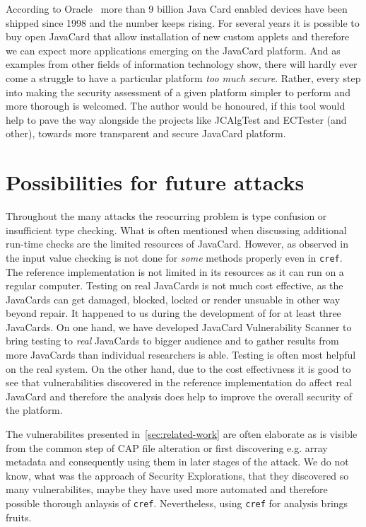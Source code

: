         According to Oracle~\cite{oraclehome} more than 9 billion Java Card enabled devices have been shipped since 1998 and the number keeps rising. For several years it is possible to buy open JavaCard that allow installation of new custom applets and therefore we can expect more applications emerging on the JavaCard platform.
        And as examples from other fields of information technology show, there will hardly ever come a struggle to have a particular platform \textit{too much secure}. Rather, every step into making the security assessment of a given platform simpler to perform and more thorough is welcomed. The author would be honoured, if this tool would help to pave the way alongside the projects like JCAlgTest and ECTester (and other), towards more transparent and secure JavaCard platform.

        \section{Possibilities for future attacks}

        Throughout the many attacks the reocurring problem is type confusion or insufficient type checking. What is often mentioned when discussing additional run-time checks are the limited resources of JavaCard. However, as observed in~\cite{se:oracle:part1, se:oracle:part2, se:oracle:part3} the input value checking is not done for \textit{some} methods properly even in \texttt{cref}. The reference implementation is not limited in its resources as it can run on a regular computer. Testing on real JavaCards is not much cost effective, as the JavaCards can get damaged, blocked, locked or render unsuable in other way beyond repair. It happened to us during the development of \javus for at least three JavaCards. On one hand, we have developed JavaCard Vulnerability Scanner to bring testing to \textit{real} JavaCards to bigger audience and to gather results from more JavaCards than individual researchers is able. Testing is often most helpful on the real system. On the other hand, due to the cost effectivness it is good to see that vulnerabilities discovered in the reference implementation do affect real JavaCard and therefore the analysis does help to improve the overall security of the platform.


        The vulnerabilites presented in~\ref{sec:related-work} are often elaborate as is visible from the common step of CAP file alteration or first discovering e.g. array metadata and consequently using them in later stages of the attack. We do not know, what was the approach of Security Explorations, that they discovered so many vulnerabilites, maybe they have used more automated and therefore possible thorough anlaysis of \texttt{cref}. Nevertheless, using \texttt{cref} for analysis brings fruits.



